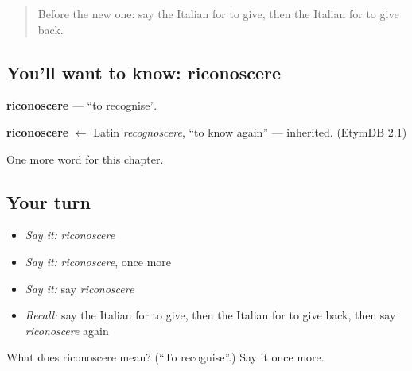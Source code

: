 \label{lesson:IT-C239-riconoscere}



\begin{quote}
Before the new one: say the Italian for to give, then the Italian for to give back.
\end{quote}

\subsection*{You'll want to know: riconoscere}
\textbf{riconoscere} — \textquotedblleft{}to recognise\textquotedblright{}.

\begin{cousinweb}
\textbf{riconoscere} $\leftarrow$ Latin \emph{recognoscere}, \textquotedblleft{}to know again\textquotedblright{} — inherited. (EtymDB 2.1)
\end{cousinweb}

\begin{grammarlens}[title={What you've built}]
One more word for this chapter.
\end{grammarlens}

\subsection*{Your turn}
\begin{itemize}
\raggedright
  \item \emph{Say it:} \emph{riconoscere}
  \item \emph{Say it:} \emph{riconoscere}, once more
  \item \emph{Say it:} say \emph{riconoscere}
  \item \emph{Recall:} say the Italian for to give, then the Italian for to give back, then say \emph{riconoscere} again
\end{itemize}

\begin{tcolorbox}[breakable,colback=teal!4,colframe=teal!35!black,title={Before you move on}]
What does riconoscere mean? (\textquotedblleft{}To recognise\textquotedblright{}.) Say it once more.
\end{tcolorbox}
